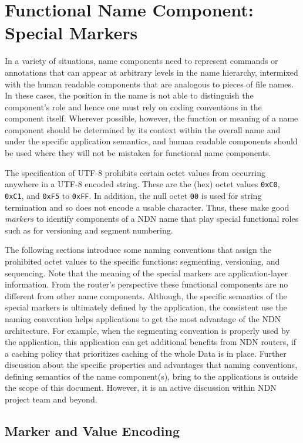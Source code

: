 \section{Functional Name Component: Special Markers}

In a variety of situations, name components need to represent commands or annotations that can appear at arbitrary levels in the name hierarchy, intermixed with the human readable components that are analogous to pieces of file names.
In these cases, the position in the name is not able to distinguish the component’s role and hence one must rely on coding conventions in the component itself.
Wherever possible, however, the function or meaning of a name component should be determined by its context within the overall name and under the specific application semantics, and human readable components should be used where they will not be mistaken for functional name components.

The specification of UTF-8 prohibits certain octet values from occurring anywhere in a UTF-8 encoded string.
These are the (hex) octet values \verb|0xC0|, \verb|0xC1|, and \verb|0xF5| to \verb|0xFF|.
In addition, the null octet \verb|00| is used for string termination and so does not encode a usable character.
Thus, these make good \emph{markers} to identify components of a NDN name that play special functional roles such as for versioning and segment numbering.

The following sections introduce some naming conventions that assign the prohibited octet values to the specific functions: segmenting, versioning, and sequencing.
Note that the meaning of the special markers are application-layer information.
From the router's perspective these functional components are no different from other name components.
Although, the specific semantics of the special markers is ultimately defined by the application, the consistent use the naming convention helps applications to get the most advantage of the NDN architecture.
For example, when the segmenting convention is properly used by the application, this application can get additional benefits from NDN routers, if a caching policy that prioritizes caching of the whole Data is in place.
Further discussion about the specific properties and advantages that naming conventions, defining semantics of the name component(s), bring to the applications is outside the scope of this document.
However, it is an active discussion within NDN project team and beyond.

\subsection{Marker and Value Encoding}
\label{sec:marker-encoding}

